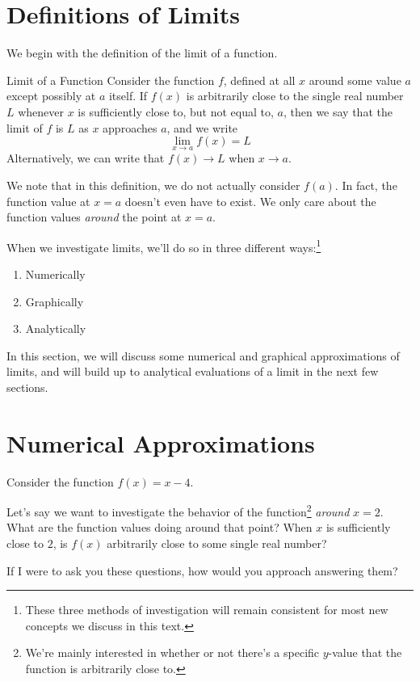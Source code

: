 \section{Definitions of Limits}

We begin with the definition of the limit of a function.

\begin{defn}{Limit of a Function}
  Consider the function $f$, defined at all $x$ around some value $a$ except possibly at $a$ itself.
  If $f(x)$ is arbitrarily close to the single real number $L$ whenever $x$ is sufficiently close to, but not equal to, $a$, then we say that the limit of $f$ is $L$ as $x$ approaches $a$, and we write
  \[\lim_{x\to a} f(x) = L\]
  Alternatively, we can write that $f(x)\to L$ when $x\to a$.
\end{defn}

We note that in this definition, we do not actually consider $f(a)$.
In fact, the function value at $x=a$ doesn't even have to exist.
We only care about the function values \textit{around} the point at $x=a$.

When we investigate limits, we'll do so in three different ways:\footnote{
These three methods of investigation will remain consistent for most new concepts we discuss in this text.}
\begin{enumerate}
  \item Numerically
  \item Graphically
  \item Analytically
\end{enumerate}

In this section, we will discuss some numerical and graphical approximations of limits, and will build up to analytical evaluations of a limit in the next few sections.

\section*{Numerical Approximations}

Consider the function $f(x) = x-4$.

Let's say we want to investigate the behavior of the function\footnote{We're mainly interested in whether or not there's a specific $y$-value that the function is arbitrarily close to.} \textit{around} $x=2$.
What are the function values doing around that point?
When $x$ is sufficiently close to $2$, is $f(x)$ arbitrarily close to some single real number?

If I were to ask you these questions, how would you approach answering them?

